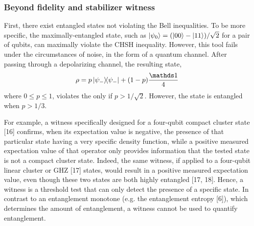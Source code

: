 \documentclass[
aps,
pra,
floatfix,
]{revtex4-2}
\theoremstyle{plain}
\theoremstyle{definition}
\newtheorem{example}{Example}
\newtheorem{remark}{Remark}
\newcommand{\dm}{\rho}
\begin{document}
\subsubsection{Beyond fidelity and stabilizer witness}
	First, there exist entangled states not violating the Bell inequalities. 
	\cite{maTransformingBellInequalities2018}
	To be more speciﬁc, the maximally-entangled state, such as $\ket{\psi_0} = ( \ket{00} - \ket{11} ) / \sqrt{2}$ for a pair of qubits, can maximally violate the CHSH inequality. 
	However, this tool fails under the circumstances of noise, in the form of a quantum channel. After passing through a depolarizing channel, the resulting state,	
	\begin{equation}
		\dm = p \op{\psi_-} + (1 - p) \frac{\identity}{4}
	\end{equation}
	where $0 \le p \le 1$, violates the  only if $p > 1/ \sqrt{2}$. However, the state is entangled when $p > 1/3$.

	\cite{sciaraUniversalPartiteLevel2019}
	For example, a witness specifically designed for a four-qubit compact cluster state [16] conﬁrms, when its expectation value is negative, the presence of that particular state having a very speciﬁc density function, while a positive measured expectation value of that operator only provides information that the tested state is not a compact cluster state. 
	Indeed, the same witness, if applied to a four-qubit linear cluster or GHZ [17] states, would result in a positive measured expectation value, even though these two states are both highly entangled [17, 18]. 
	Hence, a witness is a threshold test that can only detect the presence of a speciﬁc state. 
	In contrast to an entanglement monotone (e.g. the entanglement entropy [6]), which determines the amount of entanglement, a witness cannot be used to quantify entanglement.	
\end{document}

